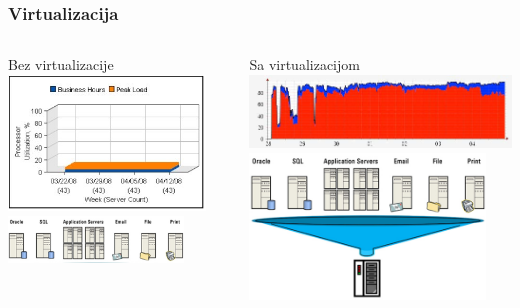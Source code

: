 \documentclass[t]{beamer}
\begin{document}
\begin{frame}
	\frametitle{Virtualizacija}
	\begin{columns}[T]
		\begin{column}{0.5\textwidth}
			\centering
			Bez virtualizacije\\
			\vspace{1em}
			\includegraphics[width=0.9\textwidth]{no_virt_chart.jpg}
			\vspace{1em}
			\includegraphics[width=0.8\textwidth]{no_virt_apps.jpg}
		\end{column}
		\begin{column}{0.5\textwidth}
			\centering
			Sa virtualizacijom\\
			\vspace{2em}
			\includegraphics[width=\textwidth]{virt_chart.jpg}
			\vspace{1em}
			\includegraphics[width=0.9\textwidth]{virt_apps.jpg}
		\end{column}
	\end{columns}
\end{frame}
\end{document}
